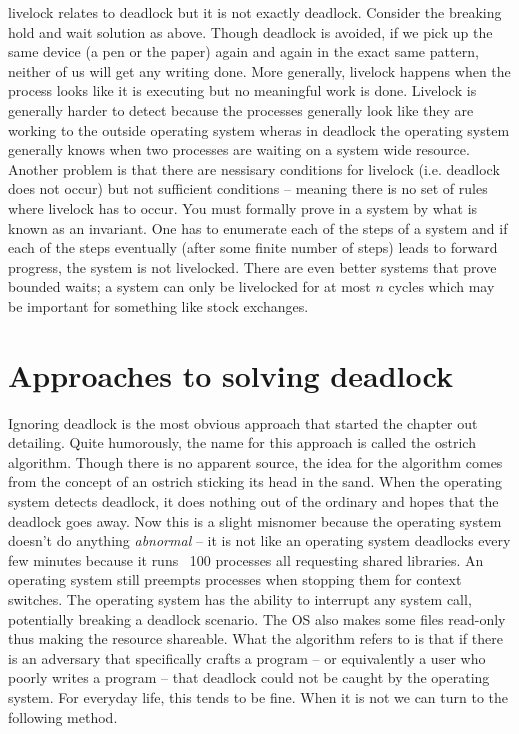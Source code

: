 \gls{livelock} relates to deadlock but it is not exactly deadlock. Consider the breaking hold and wait solution as above. Though deadlock is avoided, if we pick up the same device (a pen or the paper) again and again in the exact same pattern, neither of us will get any writing done. More generally, livelock happens when the process looks like it is executing but no meaningful work is done. Livelock is generally harder to detect because the processes generally look like they are working to the outside operating system wheras in deadlock the operating system generally knows when two processes are waiting on a system wide resource. Another problem is that there are nessisary conditions for livelock (i.e. deadlock does not occur) but not sufficient conditions -- meaning there is no set of rules where livelock has to occur. You must formally prove in a system by what is known as an invariant. One has to enumerate each of the steps of a system and if each of the steps eventually (after some finite number of steps) leads to forward progress, the system is not livelocked. There are even better systems that prove bounded waits; a system can only be livelocked for at most $n$ cycles which may be important for something like stock exchanges.

\section{Approaches to solving deadlock}

Ignoring deadlock is the most obvious approach that started the chapter out detailing. Quite humorously, the name for this approach is called the \gls{ostrich algorithm}. Though there is no apparent source, the idea for the algorithm comes from the concept of an ostrich sticking its head in the sand. When the operating system detects deadlock, it does nothing out of the ordinary and hopes that the deadlock goes away. Now this is a slight misnomer because the operating system doesn't do anything \textit{abnormal} -- it is not like an operating system deadlocks every few minutes because it runs ~100 processes all requesting shared libraries. An operating system still preempts processes when stopping them for context switches. The operating system has the ability to interrupt any system call, potentially breaking a deadlock scenario. The OS also makes some files read-only thus making the resource shareable. What the algorithm refers to is that if there is an adversary that specifically crafts a program -- or equivalently a user who poorly writes a program -- that deadlock could not be caught by the operating system. For everyday life, this tends to be fine. When it is not we can turn to the following method.


